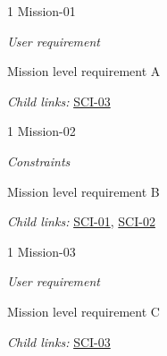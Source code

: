 \begin{frame}{1 Mission-01}

\emph{User requirement}

Mission level requirement A

\emph{Child links:} \href{L2.html\#SCI-03}{SCI-03}

\end{frame}

\begin{frame}{1 Mission-02}

\emph{Constraints}

Mission level requirement B

\emph{Child links:} \href{L2.html\#SCI-01}{SCI-01},
\href{L2.html\#SCI-02}{SCI-02}

\end{frame}

\begin{frame}{1 Mission-03}

\emph{User requirement}

Mission level requirement C

\emph{Child links:} \href{L2.html\#SCI-03}{SCI-03}

\end{frame}
